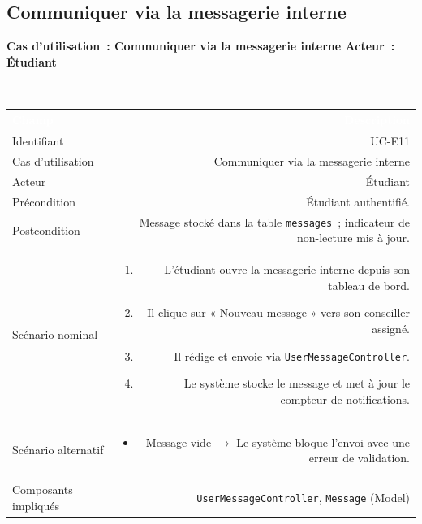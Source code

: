\documentclass[a4paper,12pt]{article}
\newcommand{\ucheader}[2]{%
  \noindent\colorbox{capblue}{\parbox{\dimexpr\linewidth-2\fboxsep}{%
    \color{white}\bfseries\large Cas d'utilisation~: #1 \hfill \normalsize Acteur~: #2
  }}\\[2pt]
}
\begin{document}
\vspace{1em}

\subsection{Communiquer via la messagerie interne}
\ucheader{Communiquer via la messagerie interne}{Étudiant}

\noindent
\begin{tabular}{|L|R|}
\hline
{}\textcolor{white}{\textbf{Champ}} & \textcolor{white}{\textbf{Description}} \\
\hline
{}Identifiant & UC-E11 \\
\hline
Cas d'utilisation & Communiquer via la messagerie interne \\
\hline
{}Acteur & Étudiant \\
\hline
Précondition & Étudiant authentifié. \\
\hline
{}Postcondition & Message stocké dans la table \texttt{messages}~; indicateur de non-lecture mis à jour. \\
\hline
Scénario nominal &
\begin{enumerate}
  \item L'étudiant ouvre la messagerie interne depuis son tableau de bord.
  \item Il clique sur « Nouveau message » vers son conseiller assigné.
  \item Il rédige et envoie via \texttt{UserMessageController}.
  \item Le système stocke le message et met à jour le compteur de notifications.
\end{enumerate} \\
\hline
{}Scénario alternatif &
\begin{itemize}
  \item Message vide $\rightarrow$ Le système bloque l'envoi avec une erreur de validation.
\end{itemize} \\
\hline
Composants impliqués & \texttt{UserMessageController}, \texttt{Message} (Model) \\
\hline
\end{tabular}

\newpage

\end{document}
